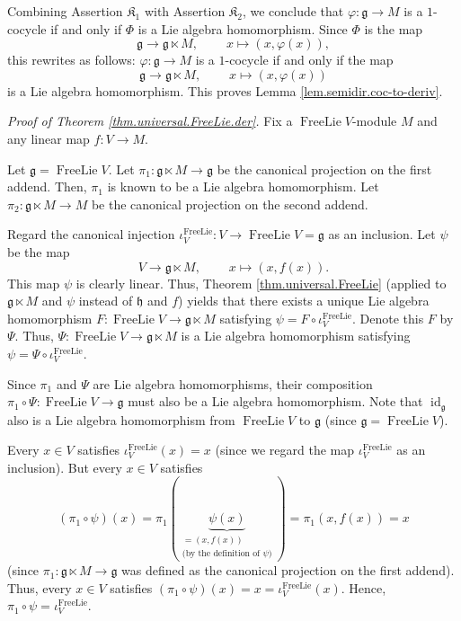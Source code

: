 \documentclass[etingof-lie.tex]{subfiles}
\begin{document}
\begin{verlong}
Combining Assertion $\mathfrak{K}_{1}$ with Assertion $\mathfrak{K}_{2}$, we
conclude that $\varphi:\mathfrak{g}\rightarrow M$ is a $1$-cocycle if and only
if $\Phi$ is a Lie algebra homomorphism. Since $\Phi$ is the map%
\[
\mathfrak{g}\rightarrow\mathfrak{g}\ltimes M,\ \ \ \ \ \ \ \ \ \ x\mapsto
\left(  x,\varphi\left(  x\right)  \right)  ,
\]
this rewrites as follows: $\varphi:\mathfrak{g}\rightarrow M$ is a $1$-cocycle
if and only if the map%
\[
\mathfrak{g}\rightarrow\mathfrak{g}\ltimes M,\ \ \ \ \ \ \ \ \ \ x\mapsto
\left(  x,\varphi\left(  x\right)  \right)
\]
is a Lie algebra homomorphism. This proves Lemma
\ref{lem.semidir.coc-to-deriv}.

\textit{Proof of Theorem \ref{thm.universal.FreeLie.der}.} Fix a
$\operatorname*{FreeLie}V$-module $M$ and any linear map $f:V\rightarrow M$.

Let $\mathfrak{g}=\operatorname*{FreeLie}V$. Let $\pi_{1}:\mathfrak{g}\ltimes
M\rightarrow\mathfrak{g}$ be the canonical projection on the first addend.
Then, $\pi_{1}$ is known to be a Lie algebra homomorphism. Let $\pi
_{2}:\mathfrak{g}\ltimes M\rightarrow M$ be the canonical projection on the
second addend.

Regard the canonical injection $\iota_{V}^{\operatorname*{FreeLie}%
}:V\rightarrow\operatorname*{FreeLie}V=\mathfrak{g}$ as an inclusion. Let
$\psi$ be the map%
\[
V\rightarrow\mathfrak{g}\ltimes M,\ \ \ \ \ \ \ \ \ \ x\mapsto\left(
x,f\left(  x\right)  \right)  .
\]
This map $\psi$ is clearly linear. Thus, Theorem \ref{thm.universal.FreeLie}
(applied to $\mathfrak{g}\ltimes M$ and $\psi$ instead of $\mathfrak{h}$ and
$f$) yields that there exists a unique Lie algebra homomorphism
$F:\operatorname*{FreeLie}V\rightarrow\mathfrak{g}\ltimes M$ satisfying
$\psi=F\circ\iota_{V}^{\operatorname*{FreeLie}}$. Denote this $F$ by $\Psi$.
Thus, $\Psi:\operatorname*{FreeLie}V\rightarrow\mathfrak{g}\ltimes M$ is a Lie
algebra homomorphism satisfying $\psi=\Psi\circ\iota_{V}%
^{\operatorname*{FreeLie}}$.

Since $\pi_{1}$ and $\Psi$ are Lie algebra homomorphisms, their composition
$\pi_{1}\circ\Psi:\operatorname*{FreeLie}V\rightarrow\mathfrak{g}$ must also
be a Lie algebra homomorphism. Note that $\operatorname*{id}%
\nolimits_{\mathfrak{g}}$ also is a Lie algebra homomorphism from
$\operatorname*{FreeLie}V$ to $\mathfrak{g}$ (since $\mathfrak{g}%
=\operatorname*{FreeLie}V$).

Every $x\in V$ satisfies $\iota_{V}^{\operatorname*{FreeLie}}\left(  x\right)
=x$ (since we regard the map $\iota_{V}^{\operatorname*{FreeLie}}$ as an
inclusion). But every $x\in V$ satisfies%
\[
\left(  \pi_{1}\circ\psi\right)  \left(  x\right)  =\pi_{1}\left(
\underbrace{\psi\left(  x\right)  }_{\substack{=\left(  x,f\left(  x\right)
\right)  \\\text{(by the definition of }\psi\text{)}}}\right)  =\pi_{1}\left(
x,f\left(  x\right)  \right)  =x
\]
(since $\pi_{1}:\mathfrak{g}\ltimes M\rightarrow\mathfrak{g}$ was defined as
the canonical projection on the first addend). Thus, every $x\in V$ satisfies
$\left(  \pi_{1}\circ\psi\right)  \left(  x\right)  =x=\iota_{V}%
^{\operatorname*{FreeLie}}\left(  x\right)  $. Hence, $\pi_{1}\circ\psi
=\iota_{V}^{\operatorname*{FreeLie}}$.


\end{verlong}
\end{document}
